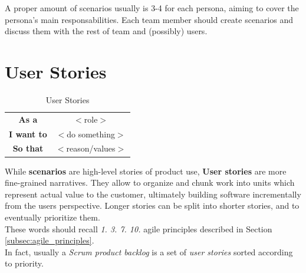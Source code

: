 \begin{center}
\end{center}

A proper amount of scenarios usually is 3-4 for each persona, aiming to cover the persona's main responsabilities.
Each team member should create scenarios and discuss them with the rest of team and (possibly) users.

\section{User Stories}
\begin{table}[h]
    \centering
    \begin{tabular}{|cc|}
        \hline
        \textbf{As a} & \hspace{2.5cm} $<$role$>$\\
        \textbf{I want to} & \hspace{2.5cm} $<$do something$>$ \\
        \textbf{So that} & \hspace{2.5cm} $<$reason/values$>$ \\
        \hline
    \end{tabular}
    \caption{User Stories}
    \label{tab:my_label}
\end{table}

While \textbf{scenarios} are high-level stories of product use, \textbf{User stories} are more fine-grained narratives.
They allow to organize and chunk work into units which represent actual value to the customer, ultimately building software incrementally from the users perspective.
Longer stories can be split into shorter stories, and to eventually prioritize them.\\
These words should recall \textit{1. 3. 7. 10.} agile principles described in Section \ref{subsec:agile_principles}.\\
In fact, usually a \textit{Scrum product backlog} is a set of \textit{user stories} sorted according to priority.

